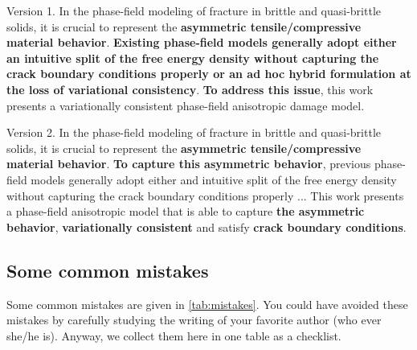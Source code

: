 \documentclass[authoryear,12pta4paper,fleqn]{article}
\numberwithin{equation}{section}
\theoremstyle{remark}
\begin{document}
\begin{MyBox}[width=0.48\textwidth,nobeforeafter,label={version1}]
{Version 1.}
{
In the phase-field modeling of fracture in brittle and quasi-brittle solids, it is crucial to represent the \textbf{asymmetric tensile/compressive material behavior}. \textbf{Existing phase-field models generally adopt either an intuitive split of the free energy density without capturing the crack boundary conditions properly or an ad hoc hybrid formulation at the loss of variational consistency}. \textbf{To address this issue}, this work presents a variationally consistent phase-field anisotropic damage model.}
\end{MyBox}\hfill
\begin{MyBox}[width=0.48\textwidth,nobeforeafter,label={version2}]
{Version 2.}
{
In the phase-field modeling of fracture in brittle and quasi-brittle solids, it is crucial to represent the \textbf{asymmetric tensile/compressive material behavior}. \textbf{To capture this asymmetric behavior}, previous phase-field models  generally adopt either and intuitive split of the free energy density without capturing the crack boundary conditions properly ... This work presents a phase-field anisotropic model that is able to capture \textbf{the asymmetric behavior}, \textbf{variationally consistent} and satisfy \textbf{crack boundary conditions}.}
\end{MyBox}



% 
\subsection{Some common mistakes}\label{sec:mistakes}


Some common mistakes are given in \cref{tab:mistakes}. You could have avoided these mistakes by carefully studying the writing of your favorite author (who ever she/he is). Anyway, we collect them here in one table as a checklist.
\end{document}
